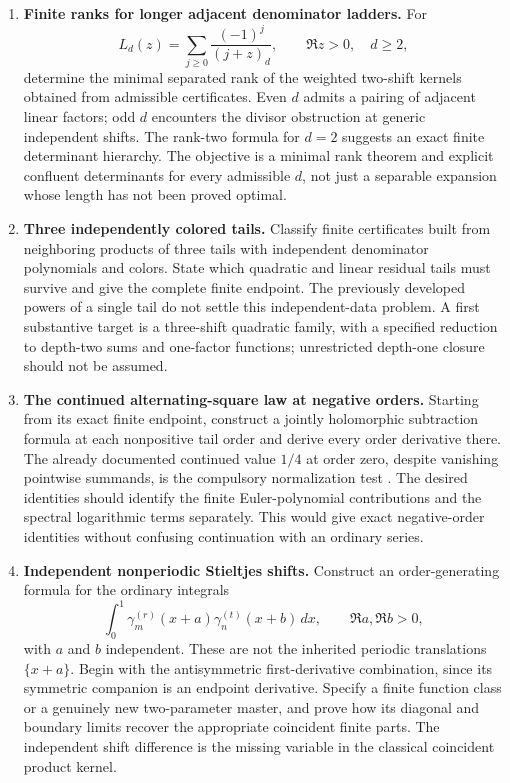 \documentclass[11pt,letterpaper]{article}
\numberwithin{equation}{section}
\theoremstyle{definition}
\theoremstyle{remark}
\begin{document}
\begin{enumerate}[leftmargin=*,label=\textbf{R\arabic*.}]
\item \textbf{Finite ranks for longer adjacent denominator ladders.}
For
\[
 L_d(z)=\sum_{j\ge0}\frac{(-1)^j}{(j+z)_d},\qquad
 \Re z>0,\quad d\ge2,
\]
determine the minimal separated rank of the weighted two-shift kernels
obtained from admissible certificates. Even $d$ admits a pairing of
adjacent linear factors; odd $d$ encounters the divisor obstruction
at generic independent shifts. The rank-two formula for $d=2$
suggests an exact finite determinant hierarchy. The objective is a
minimal rank theorem and explicit confluent determinants for every
admissible $d$, not just a separable expansion whose length has not
been proved optimal.

\item \textbf{Three independently colored tails.}
Classify finite certificates built from neighboring products of three
tails with independent denominator polynomials and colors. State
which quadratic and linear residual tails must survive and give the
complete finite endpoint. The previously developed powers of a single
tail do not settle this independent-data problem. A first substantive
target is a three-shift quadratic family, with a specified reduction
to depth-two sums and one-factor functions; unrestricted depth-one
closure should not be assumed.

\item \textbf{The continued alternating-square law at negative orders.}
Starting from its exact finite endpoint, construct a jointly
holomorphic subtraction formula at each nonpositive tail order and
derive every order derivative there. The already documented
continued value $1/4$ at order zero, despite vanishing pointwise
summands, is the compulsory normalization test
\cite{tail-alternating}. The desired identities should identify the
finite Euler-polynomial contributions and the spectral logarithmic
terms separately. This would give exact negative-order identities
without confusing continuation with an ordinary series.

\item \textbf{Independent nonperiodic Stieltjes shifts.}
Construct an order-generating formula for the ordinary integrals
\[
 \int_0^1\gamma_m^{(r)}(x+a)\gamma_n^{(t)}(x+b)\,dx,
 \qquad \Re a,\Re b>0,
\]
with $a$ and $b$ independent. These are not the inherited periodic
translations $\{x+a\}$. Begin with the antisymmetric first-derivative
combination, since its symmetric companion is an endpoint derivative.
Specify a finite function class or a genuinely new two-parameter
master, and prove how its diagonal and boundary limits recover the
appropriate coincident finite parts. The independent shift difference
is the missing variable in the classical coincident product kernel.


\end{enumerate}
\end{document}
